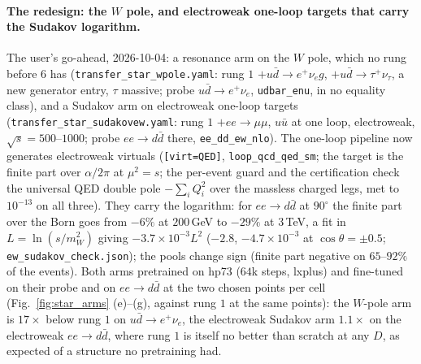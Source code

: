 \documentclass[11pt]{article}
\newcommand{\code}[1]{\texttt{#1}}
\begin{document}
\paragraph{The redesign: the $W$ pole, and electroweak one-loop targets that carry the Sudakov logarithm.} The user's
go-ahead, 2026-10-04: a resonance arm on the $W$ pole, which no
rung before $6$ has (\code{transfer\_star\_wpole.yaml}: rung $1$ $+u\bar d\to e^+\nu_eg$, $+u\bar d\to\tau^+\nu_\tau$, a new
generator entry, $\tau$ massive; probe $u\bar d\to e^+\nu_e$, \code{udbar\_enu}, in no equality class), and a Sudakov arm
on electroweak one-loop targets (\code{transfer\_star\_sudakovew.yaml}: rung $1$ $+ee\to\mu\mu$, $u\bar u$ at one loop,
electroweak, $\sqrt s=500$--$1000$; probe $ee\to d\bar d$ there, \code{ee\_dd\_ew\_nlo}). The one-loop pipeline now
generates electroweak virtuals (\code{[virt=QED]}, \code{loop\_qcd\_qed\_sm}; the target is the finite part over
$\alpha/2\pi$ at $\mu^2=s$; the per-event guard and the certification check the universal QED double pole
$-\sum_iQ_i^2$ over the massless charged legs, met to $10^{-13}$ on all three). They carry the logarithm: for
$ee\to d\bar d$ at $90^\circ$ the finite part over the Born goes from $-6\%$ at $200$\,GeV to $-29\%$ at $3$\,TeV, a
fit in $L=\ln(s/m_W^2)$ giving $-3.7\times10^{-3}L^2$ ($-2.8$, $-4.7\times10^{-3}$ at $\cos\theta=\pm0.5$;
\code{ew\_sudakov\_check.json}); the pools change sign (finite part negative on $65$--$92\%$ of the events). Both arms
pretrained on hp73 ($64$k steps, lxplus) and fine-tuned on their probe and on $ee\to d\bar d$ at the two chosen points per
cell (Fig.~\ref{fig:star_arms} (e)--(g), against rung $1$ at the same points): the $W$-pole arm is $17\times$ below rung $1$ on
$u\bar d\to e^+\nu_e$, the electroweak Sudakov arm $1.1\times$ on the electroweak $ee\to d\bar d$, where rung $1$ is itself no
better than scratch at any $D$, as expected of a structure no pretraining had.
\end{document}

